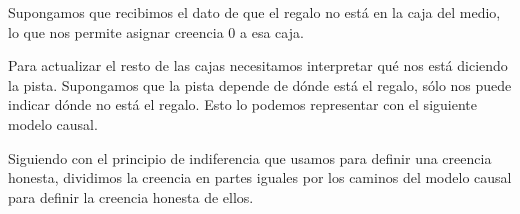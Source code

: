 \documentclass[a4paper,10pt]{book}
\theoremstyle{definition}
\begin{document}
Supongamos que recibimos el dato de que el regalo no está en la caja del medio, lo que nos permite asignar creencia 0 a esa caja.

\begin{figure}[H]
\centering
{} 
\end{figure}

Para actualizar el resto de las cajas necesitamos interpretar qué nos está diciendo la pista.
Supongamos que la pista depende de dónde está el regalo, sólo nos puede indicar dónde no está el regalo.
Esto lo podemos representar con el siguiente modelo causal.

\begin{figure}[H]
\centering
{}
\end{figure}
Siguiendo con el principio de indiferencia que usamos para definir una creencia honesta, dividimos la creencia en partes iguales por los caminos del modelo causal para definir la creencia honesta de ellos.
\end{document}

